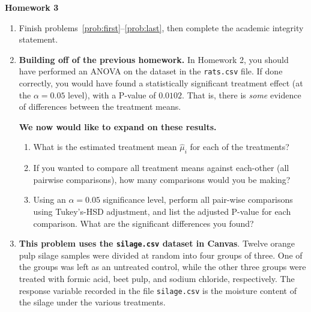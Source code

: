 \documentclass[10pt,twoside]{article}\usepackage[]{graphicx}\usepackage[dvipsnames,svgnames,table]{xcolor}
\begin{document}
\begin{flushright}
\begin{minipage}{.33\textwidth}
\rightline{\today}
\end{minipage}
\end{flushright}

\begin{center}
{\large{\textbf{Homework 3}}}
\end{center}

\begin{enumerate}
  \item Finish problems~\ref{prob:first}--\ref{prob:last}, then complete the academic integrity statement.
  \item \label{prob:first} \textbf{Building off of the previous homework.} In Homework 2, you should have performed an ANOVA on the dataset in the \texttt{rats.csv} file.
  If done correctly, you would have found a statistically significant treatment effect (at the $\alpha = 0.05$ level), with a P-value of $0.0102$.
  That is, there is \emph{some} evidence of differences between the treatment means.
  
  \textbf{We now would like to expand on these results.}
  
  \begin{enumerate}
    \item What is the estimated treatment mean $\hat{\mu}_{i}$ for each of the treatments?
    \item If you wanted to compare all treatment means against each-other (all pairwise comparisons), how many comparisons would you be making?
    \item Using an $\alpha = 0.05$ significance level, perform all pair-wise comparisons using Tukey's-HSD adjustment, and list the adjusted P-value for each comparison. What are the significant differences you found?
  \end{enumerate}
  
  \item \textbf{This problem uses the \texttt{silage.csv} dataset in Canvas}. Twelve orange pulp silage samples were divided at random into four groups of three. 
  One of the groups was left as an untreated control, while the other three groups were treated with formic acid, beet pulp, and sodium chloride, respectively. 
  The response variable recorded in the file \texttt{silage.csv} is the moisture content of the silage under the various treatments.
  

\end{enumerate}
\end{document}
